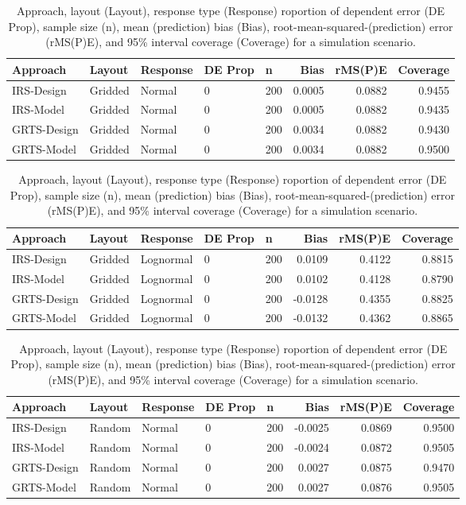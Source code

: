 \documentclass[]{elsarticle} %
\begin{document}
\begin{table}[ht]
\centering
\begin{tabular}{lllllrrr}
  \hline
Approach & Layout & Response & DE Prop & n & Bias & rMS(P)E & Coverage \\ 
  \hline
IRS-Design & Gridded & Normal & 0 & 200 & 0.0005 & 0.0882 & 0.9455 \\ 
  IRS-Model & Gridded & Normal & 0 & 200 & 0.0005 & 0.0882 & 0.9435 \\ 
  GRTS-Design & Gridded & Normal & 0 & 200 & 0.0034 & 0.0882 & 0.9430 \\ 
  GRTS-Model & Gridded & Normal & 0 & 200 & 0.0034 & 0.0882 & 0.9500 \\ 
   \hline
\end{tabular}
\caption{Approach, layout (Layout), response type (Response) roportion of dependent error (DE Prop), sample size (n), mean (prediction) bias (Bias), root-mean-squared-(prediction) error (rMS(P)E), and 95\% interval coverage (Coverage) for a simulation scenario.} 
\end{table}
\begin{table}[ht]
\centering
\begin{tabular}{lllllrrr}
  \hline
Approach & Layout & Response & DE Prop & n & Bias & rMS(P)E & Coverage \\ 
  \hline
IRS-Design & Gridded & Lognormal & 0 & 200 & 0.0109 & 0.4122 & 0.8815 \\ 
  IRS-Model & Gridded & Lognormal & 0 & 200 & 0.0102 & 0.4128 & 0.8790 \\ 
  GRTS-Design & Gridded & Lognormal & 0 & 200 & -0.0128 & 0.4355 & 0.8825 \\ 
  GRTS-Model & Gridded & Lognormal & 0 & 200 & -0.0132 & 0.4362 & 0.8865 \\ 
   \hline
\end{tabular}
\caption{Approach, layout (Layout), response type (Response) roportion of dependent error (DE Prop), sample size (n), mean (prediction) bias (Bias), root-mean-squared-(prediction) error (rMS(P)E), and 95\% interval coverage (Coverage) for a simulation scenario.} 
\end{table}
\begin{table}[ht]
\centering
\begin{tabular}{lllllrrr}
  \hline
Approach & Layout & Response & DE Prop & n & Bias & rMS(P)E & Coverage \\ 
  \hline
IRS-Design & Random & Normal & 0 & 200 & -0.0025 & 0.0869 & 0.9500 \\ 
  IRS-Model & Random & Normal & 0 & 200 & -0.0024 & 0.0872 & 0.9505 \\ 
  GRTS-Design & Random & Normal & 0 & 200 & 0.0027 & 0.0875 & 0.9470 \\ 
  GRTS-Model & Random & Normal & 0 & 200 & 0.0027 & 0.0876 & 0.9505 \\ 
   \hline
\end{tabular}
\caption{Approach, layout (Layout), response type (Response) roportion of dependent error (DE Prop), sample size (n), mean (prediction) bias (Bias), root-mean-squared-(prediction) error (rMS(P)E), and 95\% interval coverage (Coverage) for a simulation scenario.} 
\end{table}
\end{document}
